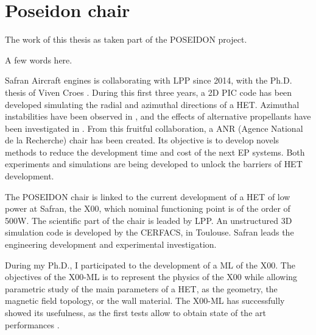 

\section*{Poseidon chair}
\label{sec-poseidon}

The work of this thesis as taken part of the POSEIDON project.

A few words here.


Safran Aircraft engines is collaborating with \ac{LPP} since 2014, with the Ph.D. thesis of Viven Croes \citep{croes2017}.
During this first three years, a \ac{2D} \ac{PIC} code has been developed simulating the radial and azimuthal directions of a \ac{HET}.
Azimuthal instabilities have been observed in \citet{croes2017a}, and the effects of alternative propellants have been investigated in \citet{croes2018}.
From this fruitful collaboration, a ANR (Agence National de la Recherche) chair has been created.
Its objective is to develop novels methods to reduce the development time and cost of the next \ac{EP} systems.
Both experiments and simulations are being developed to unlock the barriers of \ac{HET} development.

The POSEIDON chair is linked to the current development of a \ac{HET} of low power at Safran, the \PPS X00, which nominal functioning point is of the order of 500W.
The scientific part of the chair is leaded by \ac{LPP}.
An unstructured \ac{3D} simulation code is developed by the CERFACS, in Toulouse.
Safran leads the engineering development and experimental investigation.

During my Ph.D., I participated to the development of a \ac{ML} of the \PPS X00.
The objectives of the \PPS X00-\ac{ML}  is to represent the physics of the \PPS X00 while allowing parametric study of the main parameters of a \ac{HET}, as the geometry, the magnetic field topology, or the wall material.
The \PPS X00-\ac{ML} has successfully showed its usefulness, as the first tests allow to obtain state of the art performances \citep{vaudolon2018}.

